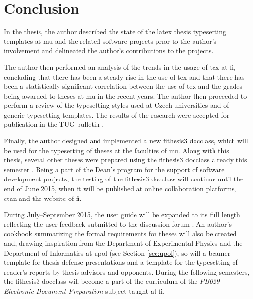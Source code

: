 \documentclass[12pt,twoside,color,table]%
  {fithesis3/fithesis3/fithesis3} %
\begin{document}
\chapter{Conclusion}
In the thesis, the author described the state of the \gls{latex}
thesis typesetting templates at \gls{mu} and the related software
projects prior to the author's involvement and delineated the
author's contributions to the projects.

The author then performed an analysis of the trends in the usage of
\gls{tex} at \gls{fi}, concluding that there has been a steady rise
in the use of \gls{tex} and that there has been a statistically
significant correlation between the use of \gls{tex} and the grades
being awarded to theses at \gls{mu} in the recent years. The author
then proceeded to perform a review of the typesetting styles used
at Czech universities and of generic typesetting templates. The
results of the research were accepted for publication in the \CS
TUG bulletin \cite{cstug}.

Finally, the author designed and implemented a new
\textsf{fithesis3} \gls{docclass}, which will be used for the
typesetting of theses at the faculties of \gls{mu}. Along with this
thesis, several other theses were prepared using the
\textsf{fithesis3} \gls{docclass} already this semester
\cite{kovanda15,zvolanek15,rucka15}. Being a part of the Dean's
program for the support of software development projects, the
testing of the \textsf{fithesis3} \gls{docclass} will continue
until the end of June 2015, when it will be published at online
collaboration platforms, \gls{ctan} and the website of \gls{fi}.

During July--September 2015, the user guide will be expanded to its
full length reflecting the user feedback submitted to the
discussion forum \cite{fithesisForum}. An author's cookbook
summarizing the formal requirements for theses will also be created
and, drawing inspiration from the Department of Experimental
Physics and the Department of Informatics at \gls{upol} (see
Section \ref{sec:upol}), so will a \gls{beamer} template for thesis
defense presentations and a template for the typesetting of
reader's reports by thesis advisors and opponents. During the
following semesters, the \textsf{fithesis3} \gls{docclass} will
become a part of the curriculum of the \emph{PB029 -- Electronic
Document Preparation} subject taught at \gls{fi}.
\end{document}
